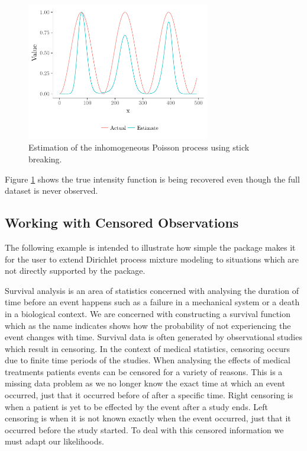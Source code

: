 \documentclass[nojss]{jss}
\begin{document}
\begin{figure}[tb]
\centering
\includegraphics[height=60mm, width=80mm]{img/poissonStickBreaking.pdf}
\caption{Estimation of the inhomogeneous Poisson process using stick breaking.}
\label{fig:poissonStick}
\end{figure}
Figure \ref{fig:poissonStick} shows the true intensity function is being recovered even though the full dataset is never observed.


\subsection{Working with Censored Observations}
The following example is intended to illustrate how simple the  package makes it for the user to extend Dirichlet process mixture modeling to situations which are not directly supported by the package.

Survival analysis is an area of statistics concerned with analysing the duration of time before an event happens such as a failure in a mechanical system or a death in a biological context. We are concerned with constructing a survival function which as the name indicates shows how the probability of not experiencing the event changes with time. Survival data is often generated by observational studies which result in censoring. In the context of medical statistics, censoring occurs due to finite time periods of the studies. When analysing the effects of medical treatments patients events can be censored for a variety of reasons. This is a missing data problem as we no longer know the exact time at which an event occurred, just that it occurred before of after a specific time. Right censoring is when a patient is yet to be effected by the event after a study ends. Left censoring is when it is not known exactly when the event occurred, just that it occurred before the study started. To deal with this censored information we must adapt our likelihoods.
\end{document}
